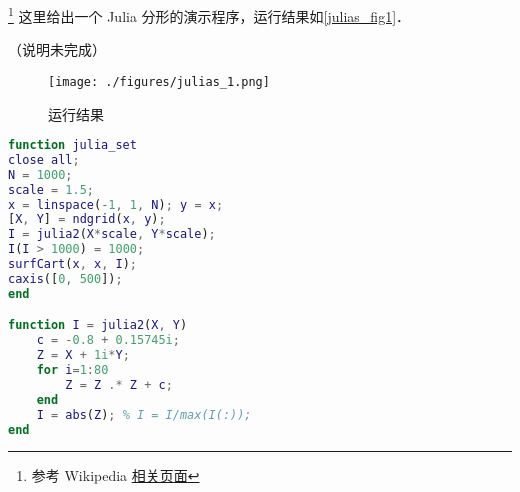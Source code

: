 
\footnote{参考 Wikipedia \href{https://en.wikipedia.org/wiki/Julia_set#Quadratic_polynomials}{相关页面}} 这里给出一个 Julia 分形的演示程序，运行结果如\autoref{julias_fig1}．

（说明未完成）

\begin{figure}[ht]
\centering
\texttt{[image: ./figures/julias\_1.png]}
\caption{运行结果} \label{julias_fig1}
\end{figure}

\begin{lstlisting}[language=matlab]
function julia_set
close all;
N = 1000;
scale = 1.5;
x = linspace(-1, 1, N); y = x;
[X, Y] = ndgrid(x, y);
I = julia2(X*scale, Y*scale);
I(I > 1000) = 1000;
surfCart(x, x, I);
caxis([0, 500]);
end

function I = julia2(X, Y)
    c = -0.8 + 0.15745i;
    Z = X + 1i*Y;
    for i=1:80
        Z = Z .* Z + c;
    end
    I = abs(Z); % I = I/max(I(:));
end
\end{lstlisting}
